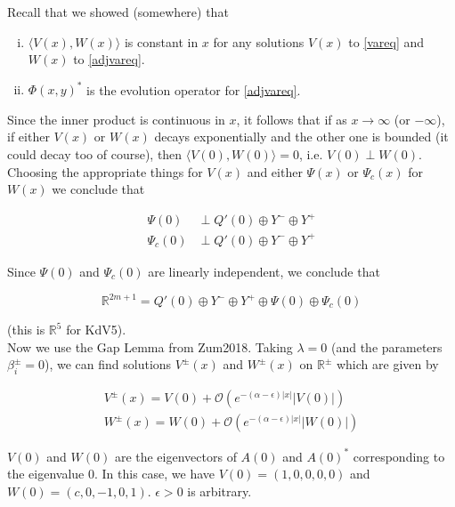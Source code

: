 \documentclass[12pt]{article}
\def\R{{\mathbb R}}
\begin{document}
Recall that we showed (somewhere) that

\begin{enumerate}[(i)]
\item $\langle V(x), W(x) \rangle$ is constant in $x$ for any solutions $V(x)$ to \eqref{vareq} and $W(x)$ to \eqref{adjvareq}.
\item $\Phi(x, y)^*$ is the evolution operator for \eqref{adjvareq}.
\end{enumerate}

Since the inner product is continuous in $x$, it follows that if as $x \rightarrow \infty$ (or $-\infty$), if either $V(x)$ or $W(x)$ decays exponentially and the other one is bounded (it could decay too of course), then $\langle V(0), W(0) \rangle = 0$, i.e. $V(0) \perp W(0)$. Choosing the appropriate things for $V(x)$ and either $\Psi(x)$ or $\Psi_c(x)$ for $W(x)$ we conclude that

\begin{align*}
\Psi(0) &\perp Q'(0) \oplus Y^- \oplus Y^+ \\
\Psi_c(0) &\perp Q'(0) \oplus Y^- \oplus Y^+
\end{align*}

Since $\Psi(0)$ and $\Psi_c(0)$ are linearly independent, we conclude that 

\[
\R^{2m + 1} = Q'(0) \oplus Y^- \oplus Y^+ \oplus \Psi(0) \oplus \Psi_c(0) 
\]

(this is $\R^5$ for KdV5).\\

Now we use the Gap Lemma from Zum2018. Taking $\lambda = 0$ (and the parameters $\beta_i^\pm = 0$), we can find solutions $V^\pm(x)$ and $W^\pm(x)$ on $\R^\pm$ which are given by

\begin{align}
V^\pm(x) = V(0) + \mathcal{O}(e^{-(\alpha - \epsilon)|x|}|V(0)|) \\
W^\pm(x) = W(0) + \mathcal{O}(e^{-(\alpha - \epsilon)|x|}|W(0)|)
\end{align}

$V(0)$ and $W(0)$ are the eigenvectors of $A(0)$ and $A(0)^*$ corresponding to the eigenvalue 0. In this case, we have $V(0) = (1, 0, 0, 0, 0)$ and $W(0) = (c, 0, -1, 0, 1)$. $\epsilon > 0$ is arbitrary.
\end{document}
